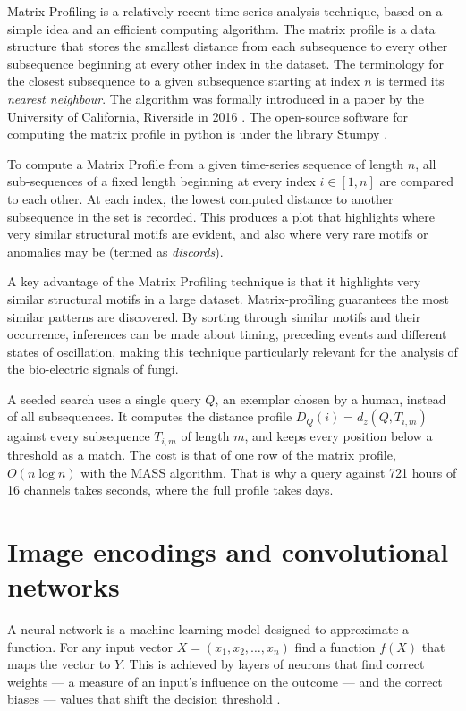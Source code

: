 Matrix Profiling is a relatively recent time-series analysis technique, based on a simple idea and an efficient computing algorithm. The matrix profile is a data structure that stores the smallest distance from each subsequence to every other subsequence beginning at every other index in the dataset. The terminology for the closest subsequence to a given subsequence starting at index $n$ is termed its \emph{nearest neighbour}. The algorithm was formally introduced in a paper by the University of California, Riverside in 2016 \cite{yeh}. The open-source software for computing the matrix profile in python is under the library Stumpy \cite{stumpy}.

To compute a Matrix Profile from a given time-series sequence of length $n$, all sub-sequences of a fixed length beginning at every index $i \in [1,n]$ are compared to each other. At each index, the lowest computed distance to another subsequence in the set is recorded. This produces a plot that highlights where very similar structural motifs are evident, and also where very rare motifs or anomalies may be (termed as \emph{discords}).

A key advantage of the Matrix Profiling technique is that it highlights very similar structural motifs in a large dataset. Matrix-profiling guarantees the most similar patterns are discovered. By sorting through similar motifs and their occurrence, inferences can be made about timing, preceding events and different states of oscillation, making this technique particularly relevant for the analysis of the bio-electric signals of fungi.

A seeded search uses a single query $Q$, an exemplar chosen by a human, instead of all subsequences. It computes the distance profile $D_Q(i) = d_z(Q, T_{i,m})$ against every subsequence $T_{i,m}$ of length $m$, and keeps every position below a threshold as a match. The cost is that of one row of the matrix profile, $O(n \log n)$ with the MASS algorithm. That is why a query against 721 hours of 16 channels takes seconds, where the full profile takes days.

\section{Image encodings and convolutional networks}
\label{sec:encodings}

A neural network is a machine-learning model designed to approximate a function. For any input vector $X = (x_1, x_2, \ldots, x_n)$ find a function $f(X)$ that maps the vector to $Y$. This is achieved by layers of neurons that find correct weights --- a measure of an input's influence on the outcome --- and the correct biases --- values that shift the decision threshold \cite{ibmnn}.

